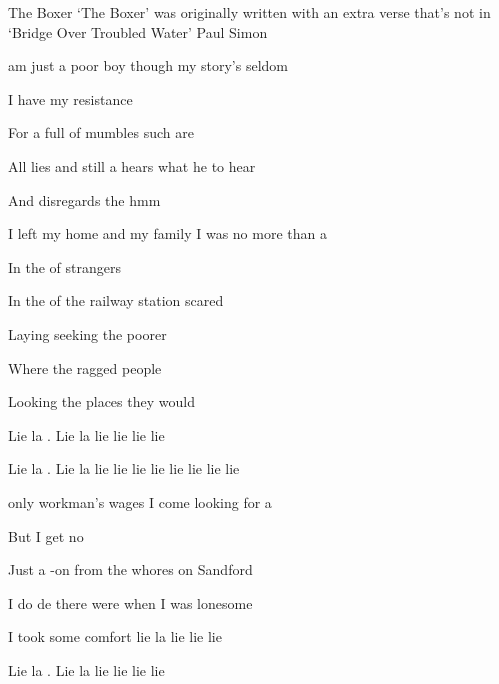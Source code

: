 \begin{SBSong}{The Boxer}
  {`The Boxer' was originally written with an extra verse that's not in `Bridge Over Troubled Water'}
  {Paul Simon}
  \begin{SBVerse}  
     am just a poor boy though my story's seldom  
    
    I have  my resistance 
    
    For a  full of mumbles such are  
    
    All lies and  still a  hears what he  to hear 
    
    And disregards the  hmm  
  \end{SBVerse}
  
  \begin{SBVerse}
     I left my home and my family I was no more than a  
    
    In the  of strangers 
    
    In the  of the railway station  scared
 
    Laying  seeking  the poorer 
 
    Where the ragged people  
    
    Looking  the places  they would  
  \end{SBVerse}
  \begin{SBChorus}
    Lie la . Lie la  lie lie lie lie
    
    Lie la . Lie la  lie lie lie lie lie lie lie lie  
  \end{SBChorus}
  \begin{SBVerse}
     only workman's wages I come looking for a 
    
    But I get no  
    
    Just a -on from the whores on Sandford 
 
    I do de there were  when I was  lonesome 
    
    I took some comfort  lie la  lie lie lie 
  \end{SBVerse}
  \begin{SBChorus}
    Lie la . Lie la  lie lie lie lie
    

\end{SBChorus}
\end{SBSong}
